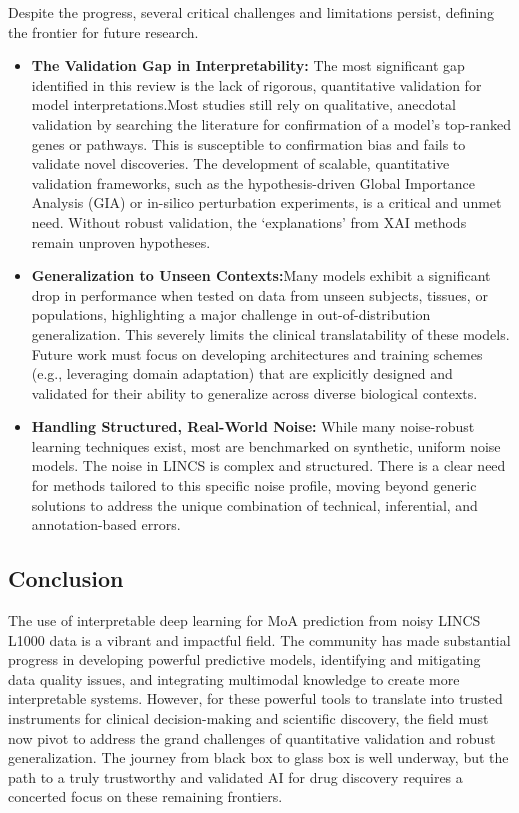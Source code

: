 \documentclass[twocolumn,12pt,a4paper]{article}
\begin{document}
Despite the progress, several critical challenges and limitations persist, defining the frontier for future research.
    \begin{itemize}
        \item \textbf{The Validation Gap in Interpretability: } The most significant gap identified in this review is the lack of rigorous, quantitative validation for model interpretations.Most studies still rely on qualitative, anecdotal validation by searching the literature for confirmation of a model's top-ranked genes or pathways\cite{samal2022opportunities}. This is susceptible to confirmation bias and fails to validate novel discoveries. The development of scalable, quantitative validation frameworks, such as the hypothesis-driven Global Importance Analysis (GIA) or in-silico perturbation experiments, is a critical and unmet need. Without robust validation, the `explanations' from XAI methods remain unproven hypotheses.
        \item \textbf{Generalization to Unseen Contexts:}Many models exhibit a significant drop in performance when tested on data from unseen subjects, tissues, or populations, highlighting a major challenge in out-of-distribution generalization\cite{mcdermott2019deep}. This severely limits the clinical translatability of these models. Future work must focus on developing architectures and training schemes (e.g., leveraging domain adaptation) that are explicitly designed and validated for their ability to generalize across diverse biological contexts.
        \item \textbf{Handling Structured, Real-World Noise:} While many noise-robust learning techniques exist, most are benchmarked on synthetic, uniform noise models. The noise in LINCS is complex and structured. There is a clear need for methods tailored to this specific noise profile, moving beyond generic solutions to address the unique combination of technical, inferential, and annotation-based errors.
    \end{itemize}

\subsection{Conclusion}
The use of interpretable deep learning for MoA prediction from noisy LINCS L1000 data is a vibrant and impactful field. The community has made substantial progress in developing powerful predictive models, identifying and mitigating data quality issues, and integrating multimodal knowledge to create more interpretable systems. However, for these powerful tools to translate into trusted instruments for clinical decision-making and scientific discovery, the field must now pivot to address the grand challenges of quantitative validation and robust generalization. The journey from black box to glass box is well underway, but the path to a truly trustworthy and validated AI for drug discovery requires a concerted focus on these remaining frontiers.
\end{document}
